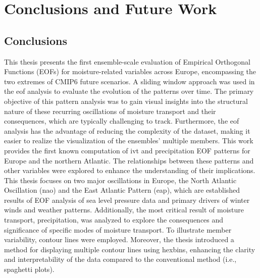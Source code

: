 
\chapter{Conclusions and Future Work}
\label{ch:conclusions}

\section{Conclusions}
\label{sec:conclusions}


This thesis presents the first ensemble-scale evaluation of Empirical Orthogonal Functions (EOFs) for moisture-related variables across Europe, encompassing the two extremes of CMIP6 future scenarios. 
A sliding window approach was used in the \ac{eof} analysis to evaluate the evolution of the patterns over time. 
The primary objective of this pattern analysis was to gain visual insights into the structural nature of these recurring oscillations of moisture transport and their consequences, which are typically challenging to track.
Furthermore, the \ac{eof} analysis has the advantage of reducing the complexity of the dataset, making it easier to realize the visualization of the ensembles' multiple members.
This work provides the first known computation of \ac{ivt} and precipitation EOF patterns for Europe and the northern Atlantic. 
The relationships between these patterns and other variables were explored to enhance the understanding of their implications. 
This thesis focuses on two major oscillations in Europe, the North Atlantic Oscillation (\ac{nao}) and the East Atlantic Pattern (\ac{eap}), which are established results of EOF analysis of sea level pressure data and primary drivers of winter winds and weather patterns.
Additionally, the most critical result of moisture transport, precipitation, was analyzed to explore the consequences and significance of specific modes of moisture transport. 
To illustrate member variability, contour lines were employed. 
Moreover, the thesis introduced a method for displaying multiple contour lines using hexbins, enhancing the clarity and interpretability of the data compared to the conventional method (i.e., spaghetti plots). 
%
